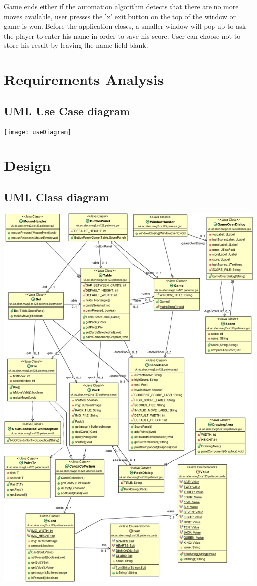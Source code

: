\documentclass[a4paper, 11pt, titlepage]{article}
\begin{document}
Game ends either if the automation algorithm detects that there are no more moves 
available, user presses the 'x' exit button on the top of the window or game is won.
Before the application closes, a smaller window will pop up to ask the player to enter
his name in order to save his score. User can choose not to store his result by leaving
the name field blank.

\newpage

\section{Requirements Analysis}
\subsection{UML Use Case diagram}
\texttt{[image: useDiagram]}

\section{Design}
\subsection{UML Class diagram}
\includegraphics[width=\textwidth]{classDiagram}
\end{document}
